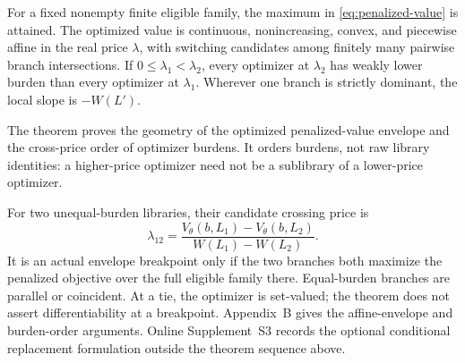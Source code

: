\begin{theorem}
\label{thm:penalized-envelope}
For a fixed nonempty finite eligible family, the maximum in
\eqref{eq:penalized-value} is attained.  The optimized value is continuous,
nonincreasing, convex, and piecewise affine in the real price \(\lambda\),
with switching candidates among finitely many pairwise branch intersections.
If \(0\le\lambda_1<\lambda_2\), every optimizer at \(\lambda_2\) has weakly
lower burden than every optimizer at \(\lambda_1\).  Wherever one branch is
strictly dominant, the local slope is \(-W(L')\).
\end{theorem}

The theorem proves the geometry of the optimized penalized-value envelope and
the cross-price order of optimizer burdens.  It orders burdens, not raw
library identities: a higher-price optimizer need not be a sublibrary of a
lower-price optimizer.

For two unequal-burden libraries, their candidate crossing price is
\begin{equation}\label{eq:resource-price-candidate}
 \lambda_{12}
 =\frac{V_\theta(b,L_1)-V_\theta(b,L_2)}
        {W(L_1)-W(L_2)}.
\end{equation}
It is an actual envelope breakpoint only if the two branches both maximize
the penalized objective over the full eligible family there.  Equal-burden
branches are parallel or coincident.  At a tie, the optimizer is set-valued;
the theorem does not assert differentiability at a breakpoint.  Appendix~B
gives the affine-envelope and burden-order arguments.  Online Supplement~S3
records the optional conditional replacement formulation
outside the theorem sequence above.






